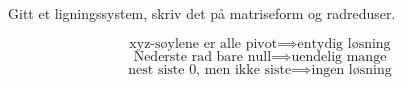 Gitt et ligningssystem, skriv det på matriseform og radreduser.

$$\text{xyz-søylene er alle pivot} \implies \text{entydig løsning}$$
$$\text{Nederste rad bare null} \implies \text{uendelig mange}$$
$$\text{nest siste 0, men ikke siste} \implies \text{ingen løsning}$$
